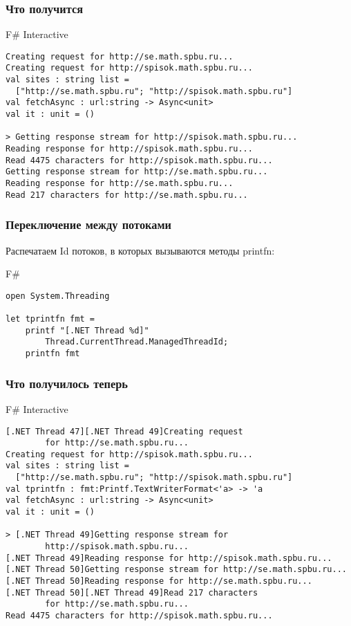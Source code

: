 \documentclass[xetex,mathserif,serif]{beamer}
\begin{document}
    \begin{frame}[fragile]
        \frametitle{Что получится}
		\begin{alertblock}{F\# Interactive}
			\begin{lstlisting}[basicstyle=\scriptsize,keywordstyle=\color{black},emphstyle=\color{black}]
Creating request for http://se.math.spbu.ru...
Creating request for http://spisok.math.spbu.ru...
val sites : string list =
  ["http://se.math.spbu.ru"; "http://spisok.math.spbu.ru"]
val fetchAsync : url:string -> Async<unit>
val it : unit = ()

> Getting response stream for http://spisok.math.spbu.ru...
Reading response for http://spisok.math.spbu.ru...
Read 4475 characters for http://spisok.math.spbu.ru...
Getting response stream for http://se.math.spbu.ru...
Reading response for http://se.math.spbu.ru...
Read 217 characters for http://se.math.spbu.ru...
\end{lstlisting}
\end{alertblock}
\end{frame}

    \begin{frame}[fragile]
        \frametitle{Переключение между потоками}
        Распечатаем Id потоков, в которых вызываются методы printfn:
        \begin{exampleblock}{F\#}
    		\begin{lstlisting}
open System.Threading

let tprintfn fmt =
    printf "[.NET Thread %d]"   
        Thread.CurrentThread.ManagedThreadId;
    printfn fmt
\end{lstlisting}
\end{exampleblock}
\end{frame}
    
    \begin{frame}[fragile]
        \frametitle{Что получилось теперь}
   		\begin{alertblock}{F\# Interactive}
   			\begin{lstlisting}[basicstyle=\scriptsize,keywordstyle=\color{black},emphstyle=\color{black}]
[.NET Thread 47][.NET Thread 49]Creating request 
        for http://se.math.spbu.ru...
Creating request for http://spisok.math.spbu.ru...
val sites : string list =
  ["http://se.math.spbu.ru"; "http://spisok.math.spbu.ru"]
val tprintfn : fmt:Printf.TextWriterFormat<'a> -> 'a
val fetchAsync : url:string -> Async<unit>
val it : unit = ()

> [.NET Thread 49]Getting response stream for 
        http://spisok.math.spbu.ru...
[.NET Thread 49]Reading response for http://spisok.math.spbu.ru...
[.NET Thread 50]Getting response stream for http://se.math.spbu.ru...
[.NET Thread 50]Reading response for http://se.math.spbu.ru...
[.NET Thread 50][.NET Thread 49]Read 217 characters 
        for http://se.math.spbu.ru...
Read 4475 characters for http://spisok.math.spbu.ru...
\end{lstlisting}
\end{alertblock}
\end{frame}
    
\end{document}
